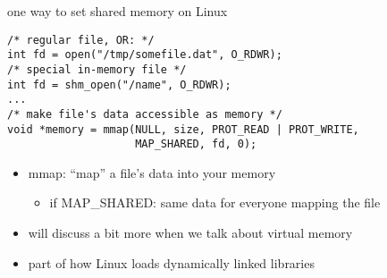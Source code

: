 \begin{frame}[fragile,label=shmMmap]{one way to set shared memory on Linux}
\lstset{style=smaller,language=C++}
\begin{lstlisting}
/* regular file, OR: */
int fd = open("/tmp/somefile.dat", O_RDWR);
/* special in-memory file */
int fd = shm_open("/name", O_RDWR);
...
/* make file's data accessible as memory */
void *memory = mmap(NULL, size, PROT_READ | PROT_WRITE,
                    MAP_SHARED, fd, 0);
\end{lstlisting}
\begin{itemize}
    \item mmap: ``map'' a file's data into your memory
        \begin{itemize}
        \item if MAP\_SHARED: same data for everyone mapping the file
        \end{itemize}
    \item will discuss a bit more when we talk about virtual memory
    \item part of how Linux loads dynamically linked libraries
\end{itemize}
\end{frame}
